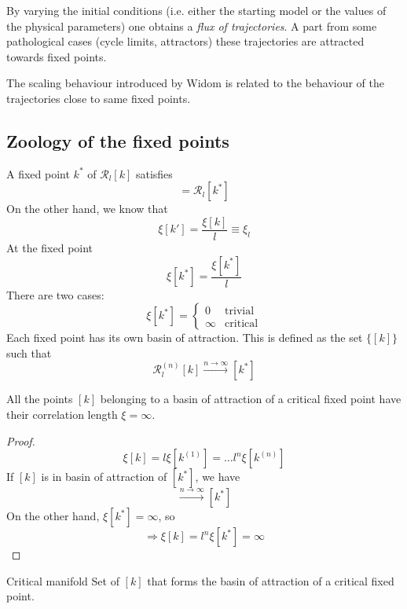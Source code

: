 \documentclass[../main/main.tex]{subfiles}
\begin{document}
By varying the initial conditions (i.e. either the starting model or the values of the physical parameters) one obtains a \emph{flux of trajectories}.
A part from some pathological cases (cycle limits, attractors) these trajectories are attracted towards fixed points.

The scaling behaviour introduced by Widom is related to the behaviour of the trajectories close to same fixed points.

 \subsection{Zoology of the fixed points}
 A fixed point \( k^* \) of \( \mathcal{R}_l [k] \) satisfies
 \begin{equation}
   [k^*] = \mathcal{R}_l [k^*]
 \end{equation}
On the other hand, we know that
\begin{equation}
  \xi [k'] = \frac{\xi [k]}{l} \equiv \xi _l
 \end{equation}
At the fixed point
\begin{equation}
  \xi [k^*] = \frac{\xi [k^*]}{l}
\end{equation}
There are two cases:
\begin{equation}
  \xi [k^*] =
  \begin{cases}
   0 & \text{trivial}\\
   \infty & \text{critical}
  \end{cases}
\end{equation}
Each fixed point has its own basin of attraction. This is defined as the set \( \{ [k] \}   \) such that
\begin{equation}
  \mathcal{R}_l^{(n)} [k] \overset{n \rightarrow \infty }{\longrightarrow} [k^*]
\end{equation}
\begin{theorem}{}{}
All the points \([k]  \) belonging to a basin of attraction of a critical fixed point have their correlation length \( \xi = \infty  \).
\end{theorem}
\begin{proof}
\begin{equation}
  \xi [k] = l \xi [k^{(1)}] = \dots l^n \xi [ k^{(n)}]
\end{equation}
If \( [k] \) is in basin of attraction of \( [k^*] \), we have
\begin{equation}
  [k^{(n)}] \overset{n \rightarrow \infty }{\longrightarrow} [k^*]
\end{equation}
On the other hand, \( \xi [k^*] = \infty  \), so
\begin{equation}
  \Rightarrow \xi [k] = l^n \xi [k^*] = \infty
\end{equation}
\end{proof}
\begin{definition}{Critical manifold}{}
 Set of \( [k] \) that forms the basin of attraction of a critical fixed point.
\end{definition}
\end{document}
